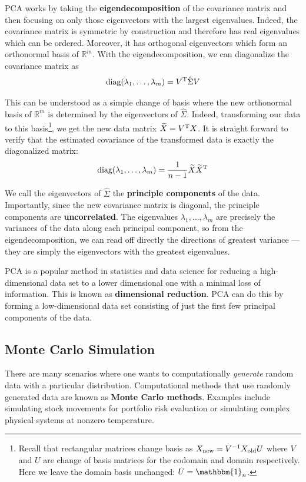 \documentclass[onecolumn]{gwclass}
\begin{document}
PCA works by taking the \textbf{eigendecomposition} of the covariance matrix and then focusing on only those eigenvectors with the largest eigenvalues. Indeed, the covariance matrix is symmetric by construction and therefore has real eigenvalues which can be ordered. Moreover, it has orthogonal eigenvectors which form an orthonormal basis of $\mathbb{R}^m$. With the eigendecomposition, we can diagonalize the covariance matrix as
$$ \text{\normalfont{diag}}(\lambda_1, \dots, \lambda_m) = V^{\text{\normalfont{T}}}\hat{\Sigma}V $$

This can be understood as a simple change of basis where the new orthonormal basis of $\mathbb{R}^m$ is determined by the eigenvectors of $\hat{\Sigma}$. Indeed, transforming our data to this basis\footnote{Recall that rectangular matrices change basis as $X_{\text{\normalfont{new}}}=V^{-1}X_{\text{\normalfont{old}}}U$ where $V$ and $U$ are change of basis matrices for the codomain and domain respectively. Here we leave the domain basis unchanged: $U=\mathbbm{1}_n$.}, we get the new data matrix $\widetilde{X}=V^{\text{\normalfont{T}}}X$. It is straight forward to verify that the estimated covariance of the transformed data is exactly the diagonalized matrix:
$$ \text{\normalfont{diag}}(\lambda_1,\dots,\lambda_m) = \frac{1}{n-1}\widetilde{X}\widetilde{X}^{\text{\normalfont{T}}} $$

We call the eigenvectors of $\hat{\Sigma}$ the \textbf{principle components} of the data. Importantly, since the new covariance matrix is diagonal, the principle components are \textbf{uncorrelated}. The eigenvalues $\lambda_1,\dots,\lambda_m$ are precisely the variances of the data along each principal component, so from the eigendecomposition, we can read off directly the directions of greatest variance --- they are simply the eigenvectors with the greatest eigenvalues.


PCA is a popular method in statistics and data science for reducing a high-dimensional data set to a lower dimensional one with a minimal loss of information. This is known as \textbf{dimensional reduction}. PCA can do this by forming a low-dimensional data set consisting of just the first few principal components of the data. 
\vspace{1em}
\subsection{Monte Carlo Simulation}
There are many scenarios where one wants to computationally \emph{generate} random data with a particular distribution. Computational methods that use randomly generated data are known as \textbf{Monte Carlo methods}. Examples include simulating stock movements for portfolio risk evaluation or simulating complex physical systems at nonzero temperature.
\end{document}
